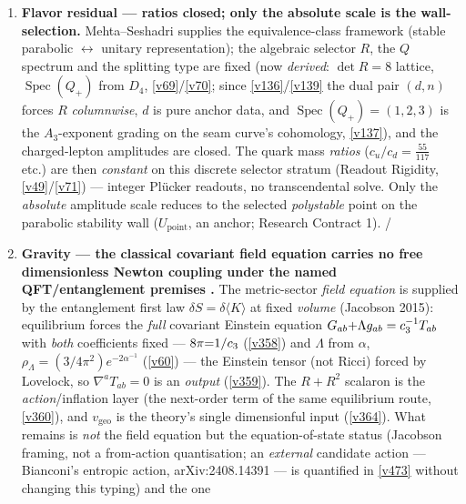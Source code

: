 \begin{gapboxnb}
\begin{enumerate}[leftmargin=1.6em,itemsep=2pt,topsep=2pt]
\item \textbf{Flavor residual --- ratios closed; only the absolute scale is the wall-selection.}
      Mehta--Seshadri supplies the equivalence-class framework (stable parabolic $\leftrightarrow$ unitary
      representation); the algebraic selector $R$, the $Q$ spectrum and the splitting type are fixed (now
      \emph{derived}: $\det R=8$ lattice, $\operatorname{Spec}(Q_+)$ from $D_4$, \vref{v69}/\vref{v70}; since
      \vref{v136}/\vref{v139} the dual pair $(d,n)$ forces $R$ \emph{columnwise}, $d$ is pure anchor data, and
      $\operatorname{Spec}(Q_+)=(1,2,3)$ is the $A_3$-exponent grading on the seam curve's cohomology,
      \vref{v137}), and the charged-lepton amplitudes are closed. The quark mass \emph{ratios}
      ($c_u/c_d=\tfrac{55}{117}$ etc.) are
      then \emph{constant} on this discrete selector stratum (Readout Rigidity, \vref{v49}/\vref{v71}) --- integer Pl\"ucker
      readouts, no transcendental solve. Only the \emph{absolute} amplitude scale reduces to the selected
      \emph{polystable} point on the parabolic stability wall ($U_{\mathrm{point}}$, an anchor; Research
      Contract 1). \mE/\mO
\item \textbf{Gravity --- the classical covariant field equation carries no free dimensionless Newton coupling under the named QFT/entanglement premises \mC.} The metric-sector \emph{field
      equation} is supplied by the entanglement first law $\delta S=\delta\langle K\rangle$ at fixed
      \emph{volume} (Jacobson 2015): equilibrium forces the \emph{full} covariant Einstein equation
      $G_{ab}{+}\Lambda g_{ab}=c_3^{-1}T_{ab}$ with \emph{both} coefficients fixed --- $8\pi{=}1/c_3$
      (\vref{v358}) and $\Lambda$ from $\alpha$, $\rho_\Lambda{=}(3/4\pi^2)e^{-2\alpha^{-1}}$ (\vref{v60}) ---
      the Einstein tensor (not Ricci) forced by Lovelock, so $\nabla^aT_{ab}{=}0$ is an \emph{output}
      (\vref{v359}). The $R{+}R^2$ scalaron is the \emph{action}/inflation layer (the next-order term of the
      same equilibrium route, \vref{v360}), and $v_{\mathrm{geo}}$ is the theory's single dimensionful input
      (\vref{v364}). What remains is \emph{not} the field equation but the equation-of-state status (Jacobson
      framing, not a from-action quantisation; an \emph{external} candidate action --- Bianconi's entropic
      action, arXiv:2408.14391 --- is quantified in \vref{v473} without changing this typing) and the one

\end{enumerate}
\end{gapboxnb}
